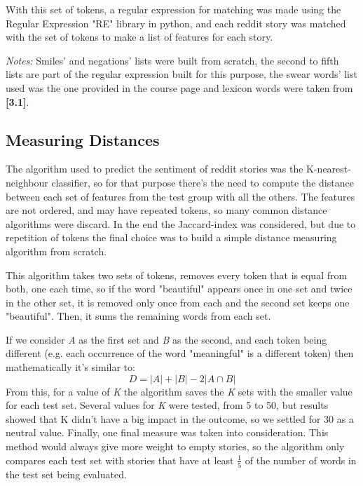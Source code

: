 \documentclass[a4paper,10pt]{article}
\begin{document}
With this set of tokens, a regular expression for matching was made using the Regular Expression "RE" library in python, and each reddit story was matched with the set of tokens to make a list of features for each story.

\emph{Notes:} Smiles' and negations' lists were built from scratch, the second to fifth lists are part of the regular expression built for this purpose, the swear words' list used was the one provided in the course page and lexicon words were taken from \textbf{[3.1]}.

\subsection{Measuring Distances}
The algorithm used to predict the sentiment of reddit stories was the K-nearest-neighbour classifier, so for that purpose there's the need to compute the distance between each set of features from the test group with all the others. The features are not ordered, and may have repeated tokens, so many common distance algorithms were discard. In the end the Jaccard-index was considered, but due to repetition of tokens the final choice was to build a simple distance measuring algorithm from scratch.

This algorithm takes two sets of tokens, removes every token that is equal from both, one each time, so if the word "beautiful" appears once in one set and twice in the other set, it is removed only once from each and the second set keeps one "beautiful". Then, it sums the remaining words from each set.

If we consider \emph{A} as the first set and \emph{B} as the second, and each token being different (e.g. each occurrence of the word "meaningful" is a different token) then mathematically it's similar to:
\begin{equation}
D=| A | + | B | - 2| A \cap B |
\end{equation}
From this, for a value of \emph{K} the algorithm saves the \emph{K} sets with the smaller value for each test set.
Several values for \emph{K} were tested, from 5 to 50, but results showed that K didn't have a big impact in the outcome, so we settled for 30 as a neutral value.
Finally, one final measure was taken into consideration. This method would always give more weight to empty stories, so the algorithm only compares each test set with stories that have at least \begin{math}\frac{1}{5}\end{math} of the number of words in the test set being evaluated.
\end{document}
